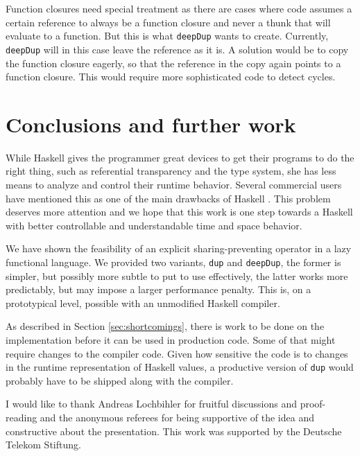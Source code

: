 \documentclass[preprint]{sigplanconf}
\theoremstyle{nonumberplain}
\newcommand{\li}{\lstinline[style=Haskell]}
\begin{document}
Function closures need special treatment as there are cases where code assumes a certain reference to always be a function closure and never a thunk that will evaluate to a function. But this is what \li-deepDup- wants to create. Currently, \li-deepDup- will in this case leave the reference as it is. A solution would be to copy the function closure eagerly, so that the reference in the copy again points to a function closure. This would require more sophisticated code to detect cycles. 

\section{Conclusions and further work}

While Haskell gives the programmer great devices to get their programs to do the right thing, such as referential transparency and the type system, she has less means to analyze and control their runtime behavior. Several commercial users have mentioned this as one of the main drawbacks of Haskell \citep{sampson,wehr,hesselink}. This problem deserves more attention and we hope that this work is one step towards a Haskell with better controllable and understandable time and space behavior.

We have shown the feasibility of an explicit sharing-preventing operator in a lazy functional language. We provided two variants, \li-dup- and \li-deepDup-, the former is simpler, but possibly more subtle to put to use effectively, the latter works more predictably, but may impose a larger performance penalty. This is, on a prototypical level, possible with an unmodified Haskell compiler.

As described in Section \ref{sec:shortcomings}, there is work to be done on the implementation before it can be used in production code. Some of that might require changes to the compiler code. Given how sensitive the code is to changes in the runtime representation of Haskell values, a productive version of \li-dup- would probably have to be shipped along with the compiler.



\acks

I would like to thank Andreas Lochbihler for fruitful discussions and proof-reading and the anonymous referees for being supportive of the idea and constructive about the presentation. This work was supported by the Deutsche Telekom Stiftung.



\end{document}
